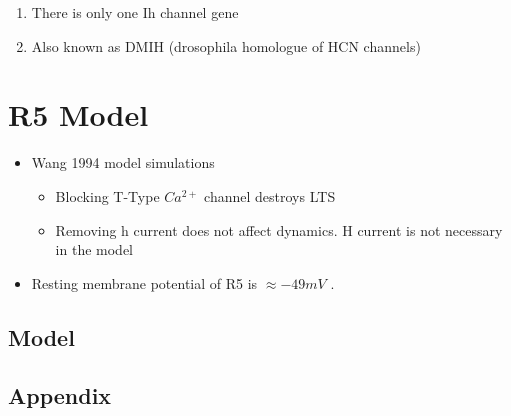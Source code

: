 \documentclass[../../workflow.tex]{subfiles}
\begin{document}
\color{red}
    \begin{enumerate}
        \item There is only one Ih channel gene \parencite{chenFunctionalStudyHyperpolarization2012,gisselmannVariantsDrosophilaMelanogaster2005}
        \item Also known as DMIH (drosophila homologue of HCN channels)
    \end{enumerate}

\color{black}

\section{R5 Model}
\etocignoretoctocdepth %
\etocsettocstyle{\subsection*{\contentsname}}{}
\localtableofcontents

\color{red}
\begin{itemize}
    \item Wang 1994 model simulations
    \begin{itemize}
        \item Blocking T-Type $Ca^{2+}$ channel destroys LTS
        \item Removing h current does not affect dynamics. H current is not
        necessary in the model
    \end{itemize}

    \item Resting membrane potential of R5 is $\approx -49 mV$ \parencite{raccugliaNetworkSpecificSynchronizationElectrical2019}.
\end{itemize}

\color{black}

\subsection{Model}

\newpage
\subsection{Appendix}
\end{document}
